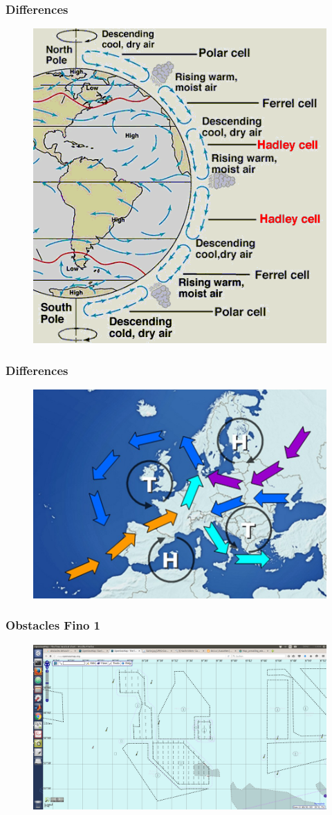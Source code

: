 \documentclass[12pt,t]{beamer}
\begin{document}
\begin{frame}
\frametitle{Differences}
\begin{figure}[H]
\centering
\includegraphics[width=0.5\linewidth]{../../figures/Ferrel_cell.png}
\label{fig:weatherpattern}
\end{figure}
\end{frame}


\begin{frame}
\frametitle{Differences}
\begin{figure}[H]
\centering
\includegraphics[width=0.7\linewidth]{../../figures/warm_air_advection.png}
\label{fig:weatherpattern}
\end{figure}
\end{frame}


\begin{frame}
\frametitle{Obstacles Fino 1}
\begin{figure}[H]
\centering
\includegraphics[width=0.8\linewidth]{../../figures/fino1.png}
\label{fig:fino1}
\end{figure} 
\end{frame}
\end{document}
